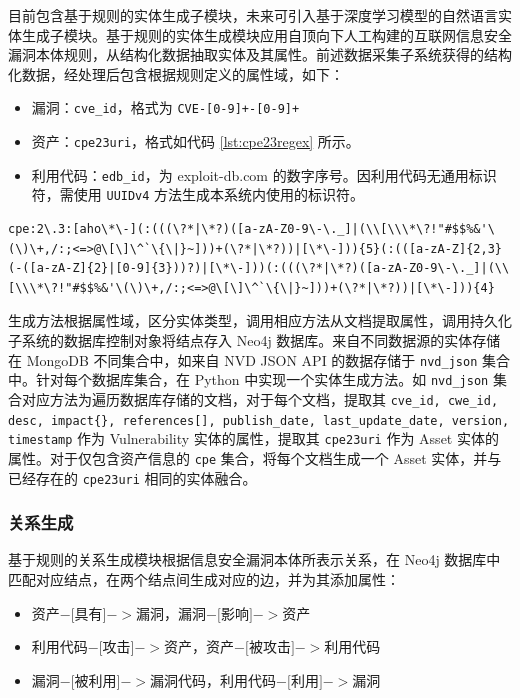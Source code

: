\documentclass[a4paper,AutoFakeBold,oneside,12pt]{book}
\begin{document}
目前包含基于规则的实体生成子模块，未来可引入基于深度学习模型的自然语言实体生成子模块。基于规则的实体生成模块应用自顶向下人工构建的互联网信息安全漏洞本体规则，从结构化数据抽取实体及其属性。前述数据采集子系统获得的结构化数据，经处理后包含根据规则定义的属性域，如下：
\begin{itemize}
	\item 漏洞：\lstinline|cve_id|，格式为 \lstinline|CVE-[0-9]+-[0-9]+|
	\item 资产：\lstinline|cpe23uri|，格式如代码 \ref{lst:cpe23regex} 所示。
	\item 利用代码：\lstinline|edb_id|，为 exploit-db.com 的数字序号。因利用代码无通用标识符，需使用 \lstinline|UUIDv4| 方法生成本系统内使用的标识符。
\end{itemize}

\begin{lstlisting}[caption={CPE 2.3 格式正则表达式},label={lst:cpe23regex},breaklines,style=lgeneral]
	cpe:2\.3:[aho\*\-](:(((\?*|\*?)([a-zA-Z0-9\-\._]|(\\[\\\*\?!"#$$%&'\(\)\+,/:;<=>@\[\]\^`\{\|}~]))+(\?*|\*?))|[\*\-])){5}(:(([a-zA-Z]{2,3}(-([a-zA-Z]{2}|[0-9]{3}))?)|[\*\-]))(:(((\?*|\*?)([a-zA-Z0-9\-\._]|(\\[\\\*\?!"#$$%&'\(\)\+,/:;<=>@\[\]\^`\{\|}~]))+(\?*|\*?))|[\*\-])){4}
\end{lstlisting}

生成方法根据属性域，区分实体类型，调用相应方法从文档提取属性，调用持久化子系统的数据库控制对象将结点存入 Neo4j 数据库。来自不同数据源的实体存储在 MongoDB 不同集合中，如来自 NVD JSON API 的数据存储于 \lstinline|nvd_json| 集合中。针对每个数据库集合，在 Python 中实现一个实体生成方法。如 \lstinline|nvd_json| 集合对应方法为遍历数据库存储的文档，对于每个文档，提取其 \lstinline|cve_id, cwe_id, desc, impact{}, references[], publish_date, last_update_date, version, timestamp| 作为 Vulnerability 实体的属性，提取其 \lstinline|cpe23uri| 作为 Asset 实体的属性。对于仅包含资产信息的 \lstinline|cpe| 集合，将每个文档生成一个 Asset 实体，并与已经存在的 \lstinline|cpe23uri| 相同的实体融合。

\subsubsection{关系生成\label{关系生成}}

基于规则的关系生成模块根据信息安全漏洞本体所表示关系，在 Neo4j 数据库中匹配对应结点，在两个结点间生成对应的边，并为其添加属性：
\begin{itemize}
	\item 资产$-[$具有$]->$漏洞，漏洞$-[$影响$]->$资产
	\item 利用代码$-[$攻击$]->$资产，资产$-[$被攻击$]->$利用代码
	\item 漏洞$-[$被利用$]->$漏洞代码，利用代码$-[$利用$]->$漏洞
\end{itemize}
\end{document}
